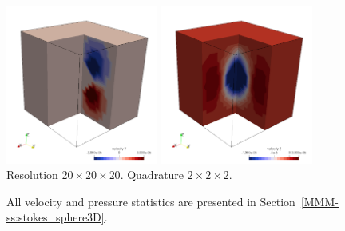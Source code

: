 \begin{center}
\includegraphics[width=5cm]{python_codes/fieldstone_82/results/bench3/v.png}
\includegraphics[width=5cm]{python_codes/fieldstone_82/results/bench3/w.png}\\
{\captionfont Resolution $20\times 20\times 20$. Quadrature $2\times 2 \times 2$.} 
\end{center}

All velocity and pressure statistics are presented in Section~\ref{MMM-ss:stokes_sphere3D}.


